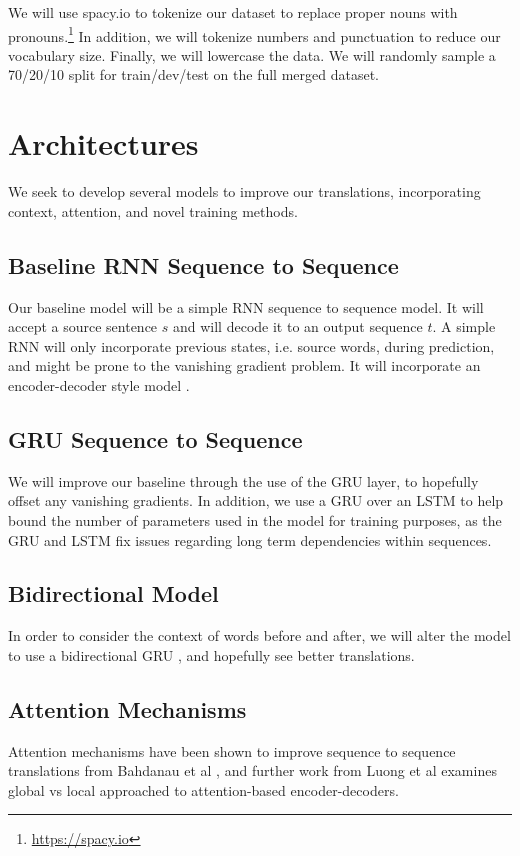 \documentclass[twoside,twocolumn]{article}
\begin{document}
We will use spacy.io to tokenize our dataset to replace proper nouns with
pronouns.\footnote{\url{https://spacy.io}} In addition, we will tokenize
numbers and punctuation to reduce our vocabulary size. Finally, we will
lowercase the data. We will randomly sample a 70/20/10 split for train/dev/test
on the full merged dataset. %


\section{Architectures}
We seek to develop several models to improve our translations, incorporating
context, attention, and novel training methods.

\subsection{Baseline RNN Sequence to Sequence}
Our baseline model will be a simple RNN sequence to sequence model. It will
accept a source sentence $s$ and will decode it to an output sequence $t$.
A simple RNN will only incorporate previous states, i.e. source words, during
prediction, and might be prone to the vanishing gradient problem. It will
incorporate an encoder-decoder style model \cite{cho2014learning}
\cite{sutskever2014sequence}.
\subsection{GRU Sequence to Sequence}
We will improve our baseline through the use of the GRU layer, to hopefully
offset any vanishing gradients. In addition, we use a GRU over an LSTM to help
bound the number of parameters used in the model for training purposes, as the
GRU and LSTM fix issues regarding long term dependencies within sequences.
\subsection{Bidirectional Model}
In order to consider the context of words before and after, we will alter the
model to use a bidirectional GRU \cite{bahdanau2014neural}, and hopefully see
better translations.
\subsection{Attention Mechanisms}
Attention mechanisms have been shown to improve sequence to sequence
translations from Bahdanau et al \cite{bahdanau2014neural}, and further work
from Luong et al \cite{luong2015effective} examines global vs local approached
to attention-based encoder-decoders.
\end{document}
